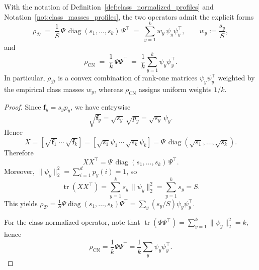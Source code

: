 \documentclass[10pt,a4paper]{amsart}
\newcommand{\diag}{\operatorname{diag}}
\newcommand{\tr}{\operatorname{tr}}
\begin{document}
\begin{Proposition}
\label{prop:exact_relation_rho_hat_rho}
With the notation of Definition~\ref{def:class_normalized_profiles} and Notation~\ref{not:class_masses_profiles}, the two operators admit the explicit forms
\[
\rho_{\mathcal D} \;=\; \frac{1}{S}\,\Psi\,\diag(s_1,\dots,s_k)\,\Psi^\top
\;=\;
\sum_{y=1}^k w_y\,\psi_y\psi_y^\top,
\qquad
w_y := \frac{s_y}{S},
\]
and
\[
\rho_{\mathrm{CN}} \;=\; \frac{1}{k}\,\Psi\Psi^\top
\;=\;
\frac{1}{k}\sum_{y=1}^k \psi_y\psi_y^\top.
\]
In particular, $\rho_{\mathcal D}$ is a convex combination of rank-one matrices $\psi_y\psi_y^\top$ weighted by the
empirical class masses $w_y$, whereas $\rho_{\mathrm{CN}}$ assigns uniform weights $1/k$.
\end{Proposition}

\begin{proof}
Since $\mathbf f_y = s_y p_y$, we have entrywise
\[
\sqrt{\mathbf f_y} = \sqrt{s_y}\,\sqrt{p_y} = \sqrt{s_y}\,\psi_y.
\]
Hence
\[
X = [\sqrt{\mathbf f_1}\,\cdots\,\sqrt{\mathbf f_k}]
   = [\sqrt{s_1}\psi_1\,\cdots\,\sqrt{s_k}\psi_k]
   = \Psi\,\diag(\sqrt{s_1},\dots,\sqrt{s_k}).
\]
Therefore
\[
XX^\top = \Psi\,\diag(s_1,\dots,s_k)\,\Psi^\top.
\]
Moreover, $\|\psi_y\|_2^2=\sum_{i=1}^d p_y(i)=1$, so
\[
\tr(XX^\top)=\sum_{y=1}^k s_y\,\|\psi_y\|_2^2=\sum_{y=1}^k s_y = S.
\]
This yields $\rho_{\mathcal D}=\frac{1}{S}\Psi\diag(s_1,\dots,s_k)\Psi^\top=\sum_y (s_y/S)\psi_y\psi_y^\top$.

For the class-normalized operator, note that $\tr(\Psi\Psi^\top)=\sum_{y=1}^k\|\psi_y\|_2^2=k$, hence
\[
\rho_{\mathrm{CN}} = \frac{1}{k}\Psi\Psi^\top = \frac{1}{k}\sum_y \psi_y\psi_y^\top.
\]
\end{proof}
\end{document}
